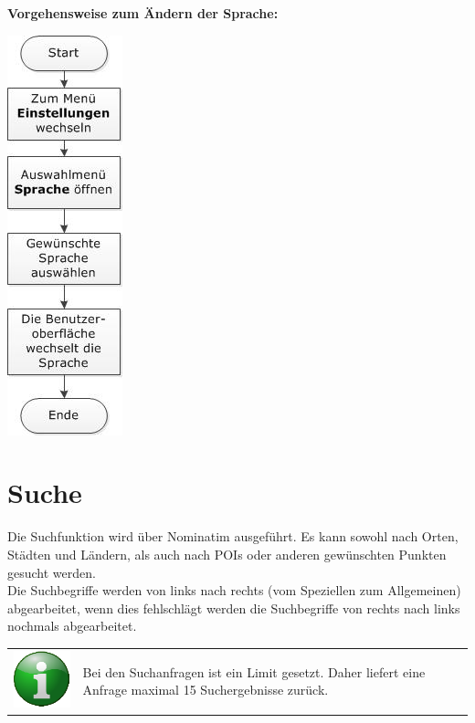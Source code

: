 \documentclass[10pt]{scrreprt}
\begin{document}
\vspace{3mm}
\textbf{Vorgehensweise zum Ändern der Sprache:}
\vspace{3mm}
\begin{center}
\includegraphics[scale=0.7]{images/sprache.jpeg}
\end{center}



\newpage
\section{Suche} 
Die Suchfunktion wird über Nominatim  ausgeführt. Es kann sowohl nach Orten, Städten und Ländern, als auch nach POIs oder anderen gewünschten Punkten gesucht werden.\\

Die Suchbegriffe werden von links nach rechts (vom Speziellen zum Allgemeinen) abgearbeitet, wenn dies fehlschlägt werden die Suchbegriffe von rechts nach links nochmals abgearbeitet.\\

\vspace{3mm}
\begin{tabular}{>{\centering \arraybackslash}m{1cm} m{14cm}}
\includegraphics[scale=0.5]{images/info.eps} & Bei den Suchanfragen ist ein Limit gesetzt. Daher liefert eine Anfrage maximal 15 Suchergebnisse zurück. \\ 
\end{tabular} 
\end{document}
